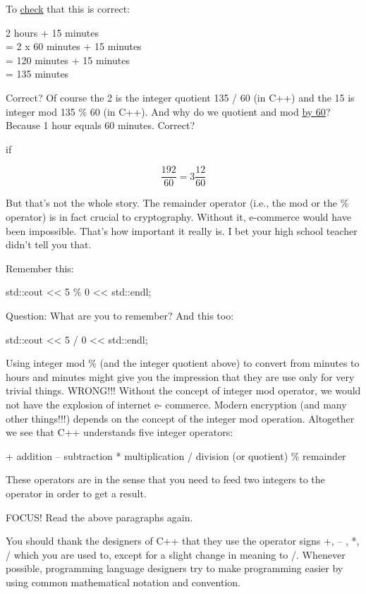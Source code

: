 To \underline{check} that this is correct:
\begin{center}
2 hours + 15 minutes\\
= 2 x 60 minutes + 15 minutes\\
= 120 minutes + 15 minutes\\
= 135 minutes
\end{center}

Correct? Of course the 2 is the integer quotient 135 / 60 (in C++) and the
15 is integer mod 135 \% 60 (in C++). And why do we quotient and mod
\underline{by 60}? Because 1 hour equals 60 minutes. Correct?

%

if

\[\frac{192}{60} = 3\frac{12}{60}\]

But that's not the whole story. The remainder operator (i.e., the mod or
the \% operator) is in fact crucial to cryptography. Without it, e-commerce
would have been impossible. That's how important it really is. I bet your
high school teacher didn't tell you that.

%
%
%
%
%
%
%

Remember this:
\begin{console}
std::cout << 5 \% 0 << std::endl;
\end{console}
Question: What are you to remember? And this too:
\begin{console}
std::cout << 5 / 0 << std::endl;
\end{console}

Using integer mod \% (and the integer quotient above) to convert from
minutes to hours and minutes might give you the impression that they
are use only for very trivial things. WRONG!!! Without the concept of
integer mod operator, we would not have the explosion of internet e-
commerce. Modern encryption (and many other things!!!) depends on the
concept of the integer mod operation.
Altogether we see that C++ understands five integer operators:
\begin{center}
  +     addition
  –     subtraction
  *     multiplication
  /     division (or quotient)
  \%     remainder
\end{center}
These operators are 
in the sense that you need to feed two
integers to the operator in order to get a result.

FOCUS! Read the above paragraphs again.

%

You should thank the designers of C++ that they use the operator signs
+, – , *, / which you are used to, except for a slight change in meaning
to /. Whenever possible, programming language designers try to make
programming easier by using common mathematical notation and
convention.

